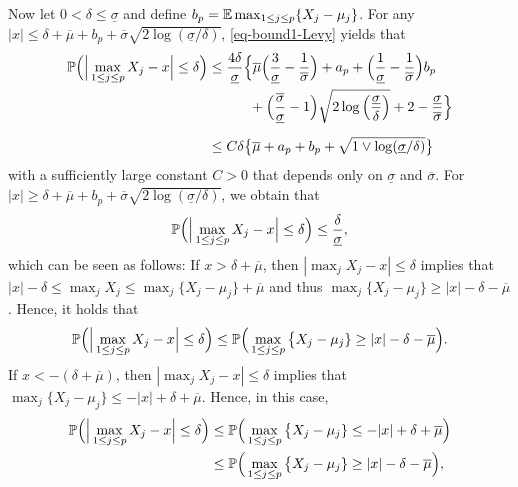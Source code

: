Now let $0 < \delta \le \underline{\sigma}$ and define $b_p = \mathbb{E} \max_{1 \le j \le p} \{X_j - \mu_j\}$. For any $|x| \le \delta + \overline{\mu} + b_p + \overline{\sigma} \sqrt{2\log(\underline{\sigma}/\delta)}$, \eqref{eq-bound1-Levy} yields that 
\begin{align}
\pr \Big( \Big| \max_{1 \le j \le p} X_j - x \Big| \le \delta \Big) 
 & \le \frac{4 \delta}{\underline{\sigma}} \Big\{ \overline{\mu} \Big( \frac{3}{\underline{\sigma}} - \frac{1}{\overline{\sigma}} \Big) + a_p + \Big( \frac{1}{\underline{\sigma}} - \frac{1}{\overline{\sigma}} \Big) b_p \nonumber \\ & \phantom{\le \frac{4 \delta}{\underline{\sigma}} \Big\{} + \Big( \frac{\overline{\sigma}}{\underline{\sigma}} - 1 \Big) \sqrt{2\log\Big(\frac{\underline{\sigma}}{\delta}\Big)} + 2 - \frac{\underline{\sigma}}{\overline{\sigma}} \Big\} \nonumber \\[0.2cm]
 & \le C \delta \big\{ \overline{\mu} + a_p + b_p + \sqrt{1 \vee \log(\underline{\sigma}/\delta)} \big\} \label{eq-bound2-Levy}
\end{align}
with a sufficiently large constant $C > 0$ that depends only on $\underline{\sigma}$ and $\overline{\sigma}$. For $|x| \ge \delta + \overline{\mu} + b_p + \overline{\sigma}\sqrt{2\log(\underline{\sigma}/\delta)}$, we obtain that 
\begin{equation}\label{eq-bound3-Levy}
\mathbb{P} \Big( \Big| \max_{1 \le j \le p} X_j - x \Big| \le \delta \Big) \le \frac{\delta}{\underline{\sigma}}, 
\end{equation}
which can be seen as follows: If $x > \delta + \overline{\mu}$, then $|\max_j X_j - x| \le \delta$ implies that $|x| - \delta \le \max_j X_j \le \max_j \{ X_j - \mu_j \} + \overline{\mu}$ and thus $\max_j \{ X_j - \mu_j \} \ge |x| - \delta - \overline{\mu}$. Hence, it holds that 
\begin{equation}\label{eq-bound3-Levy-prep1}
\mathbb{P} \Big( \Big| \max_{1 \le j \le p} X_j - x \Big| \le \delta \Big) \le \mathbb{P} \Big( \max_{1 \le j \le p} \big\{ X_j - \mu_j \} \ge |x| - \delta - \overline{\mu} \Big). 
\end{equation}
If $x < - (\delta + \overline{\mu})$, then $|\max_j X_j - x| \le \delta$ implies that $\max_j \{ X_j - \mu_j \} \le -|x| + \delta + \overline{\mu}$. Hence, in this case,
\begin{align}
\mathbb{P} \Big( \Big| \max_{1 \le j \le p} X_j - x \Big| \le \delta \Big) 
 & \le \mathbb{P} \Big( \max_{1 \le j \le p} \big\{ X_j - \mu_j \} \le -|x| + \delta + \overline{\mu} \Big) \nonumber \\
 & \le \mathbb{P} \Big( \max_{1 \le j \le p} \big\{ X_j - \mu_j \} \ge |x| - \delta - \overline{\mu} \Big), \label{eq-bound3-Levy-prep2}
\end{align}

